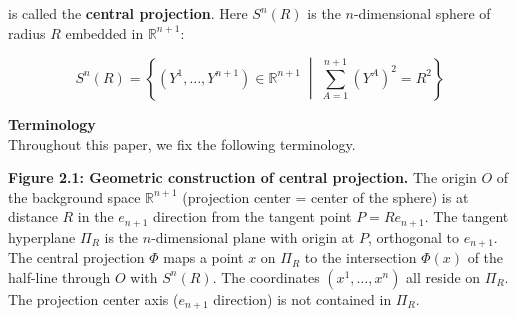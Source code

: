 \documentclass[a4paper,11pt]{article}
\theoremstyle{definition}
\begin{document}
is called the \textbf{central projection}. Here \(S^n(R)\) is the \(n\)-dimensional sphere of radius \(R\) embedded in \(\mathbb{R}^{n+1}\):

\[S^n(R) = \left\{(Y^1, \ldots, Y^{n+1}) \in \mathbb{R}^{n+1} \;\middle|\; \sum_{A=1}^{n+1} (Y^A)^2 = R^2 \right\}\]

\textbf{Terminology}\\
Throughout this paper, we fix the following terminology.

\textbf{Figure 2.1: Geometric construction of central projection.} The origin \(O\) of the background space \(\mathbb{R}^{n+1}\) (projection center = center of the sphere) is at distance \(R\) in the \(e_{n+1}\) direction from the tangent point \(P = Re_{n+1}\). The tangent hyperplane \(\Pi_R\) is the \(n\)-dimensional plane with origin at \(P\), orthogonal to \(e_{n+1}\). The central projection \(\Phi\) maps a point \(x\) on \(\Pi_R\) to the intersection \(\Phi(x)\) of the half-line through \(O\) with \(S^n(R)\). The coordinates \((x^1, \ldots, x^n)\) all reside on \(\Pi_R\). The projection center axis (\(e_{n+1}\) direction) is not contained in \(\Pi_R\).
\end{document}
